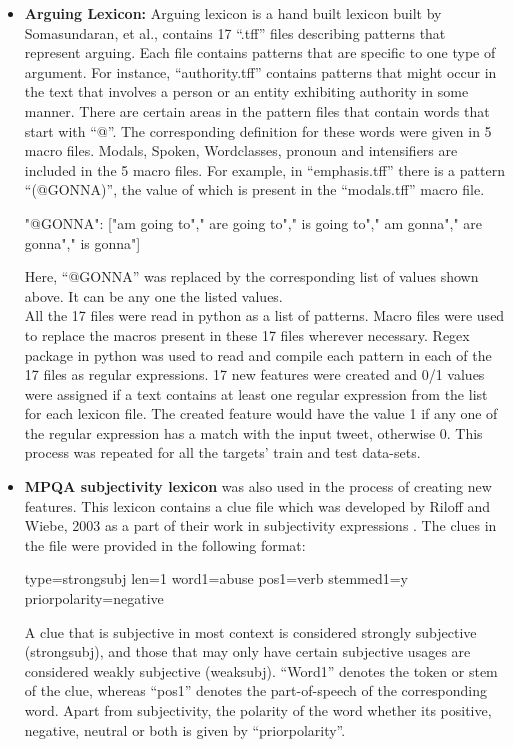 \documentclass[9pt,twocolumn,twoside]{styles/osajnl}
\begin{document}
\begin{itemize}
\item{\textbf{Arguing Lexicon:}
Arguing lexicon \cite{somasundaran2007detecting} is a hand built lexicon built by Somasundaran, et al., contains 17 “.tff” files describing patterns that represent arguing. Each file contains patterns that are specific to one type of argument. For instance, “authority.tff” contains patterns that might occur in the text that involves a person or an entity exhibiting authority in some manner. There are certain areas in the pattern files that contain words that start with “@”. The corresponding definition for these words were given in 5 macro files. Modals, Spoken, Wordclasses, pronoun and intensifiers are included in the 5 macro files. For example, in “emphasis.tff” there is a pattern “(@GONNA)”, the value of which is present in the “modals.tff” macro file. 
\begin{center}
"@GONNA": ["am going to"," are going to"," is going to"," am gonna"," are gonna"," is gonna"]
\end{center}
Here, “@GONNA” was replaced by the corresponding list of values shown above. It can be any one the listed values. \\
All the 17 files were read in python as a list of patterns. Macro files were used to replace the macros present in these 17 files wherever necessary. Regex package in python was used to read and compile each pattern in each of the 17 files as regular expressions. 17 new features were created and 0/1 values were assigned if a text contains at least one regular expression from the list for each lexicon file. The created feature would have the value 1 if any one of the regular expression has a match with the input tweet, otherwise 0. This process was repeated for all the targets’ train and test data-sets.}

\item{\textbf{MPQA subjectivity lexicon} was also used in the process of creating new features. This lexicon contains a clue file which was developed by Riloff and Wiebe, 2003 as a part of their work in subjectivity expressions \cite{riloff2003learning}. The clues in the file were provided in the following format:
\begin{center}
type=strongsubj len=1 word1=abuse pos1=verb stemmed1=y priorpolarity=negative
\end{center}
A clue that is subjective in most context is considered strongly subjective (strongsubj), and those that may only have certain subjective usages are considered weakly subjective (weaksubj). “Word1” denotes the token or stem of the clue, whereas “pos1” denotes the part-of-speech of the corresponding word. Apart from subjectivity, the polarity of the word whether its positive, negative, neutral or both is given by “priorpolarity”.}
\end{itemize}
\end{document}
